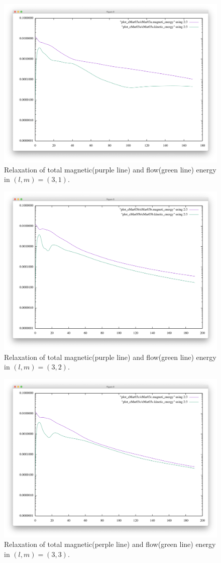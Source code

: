 \documentclass[12pt]{jsarticle}
\begin{document}
\begin{figure}[H]
\centering
\includegraphics[height=0.5\textheight,width=0.7\hsize,angle=0,keepaspectratio]{./Image/L3M1_graph.png}
\caption{Relaxation of total magnetic(purple line) and flow(green line) energy in $(l,m)=(3,1)$.} \label{L3M1_graph}
\end{figure}
\begin{figure}[H]
\centering
\includegraphics[height=0.5\textheight,width=0.7\hsize,angle=0,keepaspectratio]{./Image/L3M2_graph.png}
\caption{Relaxation of total magnetic(purple line) and flow(green line) energy in $(l,m)=(3,2)$.} \label{L3M2_graph}
\end{figure}
\begin{figure}[H]
\centering
\includegraphics[height=0.5\textheight,width=0.7\hsize,angle=0,keepaspectratio]{./Image/L3M3_graph.png}
\caption{Relaxation of total magnetic(perple line) and flow(green line) energy in $(l,m)=(3,3)$.} \label{L3M3_graph}
\end{figure}
\end{document}
